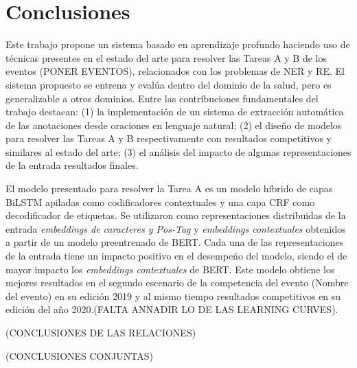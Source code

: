 \chapter*{Conclusiones}\label{chapter:conclusions}

Este trabajo propone un sistema basado en aprendizaje profundo haciendo uso de t\'ecnicas presentes en el estado del arte para resolver las Tareas A y B de los eventos (PONER EVENTOS), relacionados con los problemas de NER y RE. El sistema propuesto se entrena y eval\'ua dentro del dominio de la salud, pero es generalizable a otros dominios. Entre las contribuciones fundamentales del trabajo destacan: (1) la implementaci\'on de un sistema de extracci\'on autom\'atica de las anotaciones desde oraciones en lenguaje natural; (2) el dise\~no de modelos para resolver las Tareas A y B respectivamente con resultados competitivos y similares al estado del arte; (3) el an\'alisis del impacto de algunas representaciones de la entrada resultados finales. 

El modelo presentado para resolver la Tarea A es un modelo h\'ibrido de capas BiLSTM apiladas como codificadores contextuales y una capa CRF como decodificador de etiquetas. Se utilizaron como representaciones distribuidas de la entrada \emph{embeddings de caracteres y Pos-Tag} y \emph{embeddings contextuales} obtenidos a partir de un modelo preentrenado de BERT. Cada una de las representaciones de la entrada tiene un impacto positivo en el desempe\'no del modelo, siendo el de mayor impacto los \emph{embeddings contextuales} de BERT. Este modelo obtiene los mejores resultados en el segundo escenario de la competencia del evento (Nombre del evento) en su edici\'on 2019 y al mismo tiempo resultados competitivos en su edici\'on del a\~no 2020.(FALTA ANNADIR LO DE LAS LEARNING CURVES).

(CONCLUSIONES DE LAS RELACIONES)

(CONCLUSIONES CONJUNTAS)

  
